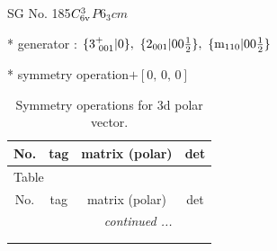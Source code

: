 \documentclass[fleqn,8pt]{jsarticle}
\begin{document}
\setcounter{MaxMatrixCols}{32}

\renewcommand{\tablename}{Table~}
\renewcommand{\figurename}{Figure~}
\begin{center}
\LARGE
SG No. 185\quad$C_{\rm 6v}^{3}$\quad$P6_3cm$\quad[ hexagonal ]
\end{center}

* generator : $\{3^{+}_{\,\,001}|0\},\,\,\{2{}_{001}|0 0 \frac{1}{2}\},\,\,\{{\rm m}_{110}|0 0 \frac{1}{2}\}$

* symmetry operation\quad$+\left[ 0,\, 0,\, 0 \right]$
\renewcommand{\arraystretch}{1.3}
\begin{longtable}{cccc}
\caption{Symmetry operations for 3d polar vector.}
 \\
 \hline \hline
No. & tag & matrix (polar) & det \\ \hline \endfirsthead

\multicolumn{3}{l}{\tablename\ \thetable{}} \\
 \hline \hline
No. & tag & matrix (polar) & det \\ \hline \endhead

 \hline \hline
\multicolumn{3}{r}{\footnotesize\it continued ...} \\ \endfoot

 \hline \hline
\multicolumn{3}{r}{} \\ \endlastfoot


\end{longtable}
\end{document}
